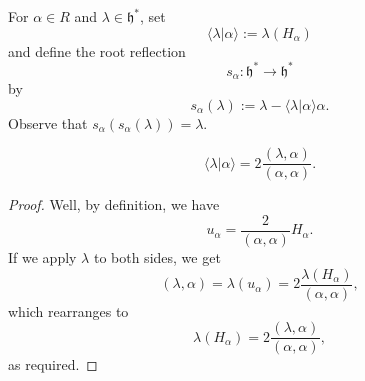 \documentclass[reqno]{amsart} 
\begin{document}
For $\alpha \in R$ and $\lambda \in \mathfrak{h}^*$, set
\begin{equation*}
  \langle \lambda|\alpha \rangle := \lambda(H_\alpha)
\end{equation*}
and define the root reflection
\begin{equation*}
  s_\alpha : \mathfrak{h}^* \rightarrow \mathfrak{h}^*
\end{equation*}
by
\begin{equation*}
  s_\alpha(\lambda) := \lambda - \langle \lambda|\alpha \rangle \alpha.
\end{equation*}
Observe that $s_\alpha(s_\alpha(\lambda)) = \lambda$.
\begin{lemma}
  \begin{equation*}
    \langle \lambda|\alpha \rangle = 2 \frac{(\lambda,\alpha)}{(\alpha,\alpha)}.
  \end{equation*}
\end{lemma}
\begin{proof}
  Well, by definition, we have
  \begin{equation*}
    u_\alpha = \frac{2}{(\alpha,\alpha)} H_\alpha.
  \end{equation*}
  If we apply $\lambda$ to both sides, we get
  \begin{equation*}
    (\lambda,\alpha) = \lambda(u_\alpha) = 2 \frac{\lambda(H_\alpha)}{(\alpha,\alpha)},
  \end{equation*}
  which rearranges to
  \begin{equation*}
    \lambda(H_\alpha) = 2 \frac{(\lambda,\alpha)}{(\alpha,\alpha)},
  \end{equation*}
  as required.
\end{proof}
\end{document}
